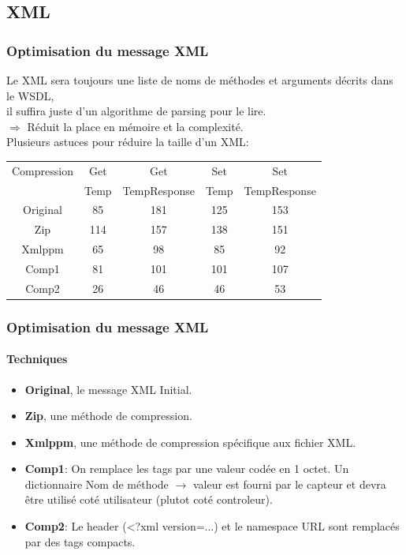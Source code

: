 \subsection{XML}
\begin{frame}
 \frametitle{Optimisation du message XML}
 Le XML sera toujours une liste de noms de méthodes et arguments décrits dans le WSDL,\\
 il suffira juste d'un algorithme de parsing pour le lire.\\
 $\Rightarrow$ Réduit la place en mémoire et la complexité.\\
 \vspace{4mm}
 Plusieurs astuces pour réduire la taille d'un XML:\\
 \begin{center}
  \begin{tabular}{|c|c|c|c|c|}
   \hline
   Compression & Get & Get & Set & Set\\
   ~ & Temp & TempResponse & Temp & TempResponse\\
   \hline
   Original & 85 & 181 & 125 & 153\\
   \hline
   Zip & 114 & 157 & 138 & 151\\
   Xmlppm & 65 & 98 & 85 & 92\\
   \hline
   Comp1 & 81 & 101 & 101 & 107\\
   Comp2 & 26 & 46 & 46 & 53\\
   \hline
  \end{tabular}
 \end{center}
\end{frame}

\begin{frame}
 \frametitle{Optimisation du message XML}
 \framesubtitle{Techniques}
 \begin{itemize}
  \item \textbf{Original}, le message XML Initial.
  \item \textbf{Zip}, une méthode de compression.
  \item \textbf{Xmlppm}, une méthode de compression spécifique aux fichier XML.
  \item \textbf{Comp1}: On remplace les tags par une valeur codée en 1 octet.
  Un dictionnaire Nom de méthode $\rightarrow$ valeur est fourni par le capteur et devra être utilisé coté utilisateur (plutot coté controleur).
  \item \textbf{Comp2}: Le header (<?xml version=...) et le namespace URL sont remplacés par des tags compacts.
 \end{itemize}
\end{frame}
